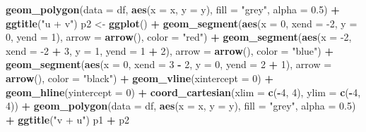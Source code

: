 \documentclass[
]{book}
\newenvironment{Shaded}{\begin{snugshade}}{\end{snugshade}}
\newcommand{\DataTypeTok}[1]{\textcolor[rgb]{0.13,0.29,0.53}{#1}}
\newcommand{\DecValTok}[1]{\textcolor[rgb]{0.00,0.00,0.81}{#1}}
\newcommand{\FloatTok}[1]{\textcolor[rgb]{0.00,0.00,0.81}{#1}}
\newcommand{\KeywordTok}[1]{\textcolor[rgb]{0.13,0.29,0.53}{\textbf{#1}}}
\newcommand{\NormalTok}[1]{#1}
\newcommand{\OperatorTok}[1]{\textcolor[rgb]{0.81,0.36,0.00}{\textbf{#1}}}
\newcommand{\StringTok}[1]{\textcolor[rgb]{0.31,0.60,0.02}{#1}}
\theoremstyle{definition}
\theoremstyle{definition}
\theoremstyle{definition}
\theoremstyle{definition}
\theoremstyle{remark}
\begin{document}
\begin{Shaded}
\begin{Highlighting}[]
\StringTok{    }\KeywordTok{geom_polygon}\NormalTok{(}\DataTypeTok{data =}\NormalTok{ df, }\KeywordTok{aes}\NormalTok{(}\DataTypeTok{x =}\NormalTok{ x, }\DataTypeTok{y =}\NormalTok{ y), }\DataTypeTok{fill =} \StringTok{"grey"}\NormalTok{, }\DataTypeTok{alpha =} \FloatTok{0.5}\NormalTok{) }\OperatorTok{+}
\StringTok{    }\KeywordTok{ggtitle}\NormalTok{(}\StringTok{"u + v"}\NormalTok{)}
\NormalTok{p2 <-}\StringTok{ }\KeywordTok{ggplot}\NormalTok{() }\OperatorTok{+}
\StringTok{    }\KeywordTok{geom_segment}\NormalTok{(}\KeywordTok{aes}\NormalTok{(}\DataTypeTok{x =} \DecValTok{0}\NormalTok{, }\DataTypeTok{xend =} \DecValTok{-2}\NormalTok{, }\DataTypeTok{y =} \DecValTok{0}\NormalTok{, }\DataTypeTok{yend =} \DecValTok{1}\NormalTok{), }\DataTypeTok{arrow =} \KeywordTok{arrow}\NormalTok{(), }\DataTypeTok{color =} \StringTok{"red"}\NormalTok{) }\OperatorTok{+}
\StringTok{    }\KeywordTok{geom_segment}\NormalTok{(}\KeywordTok{aes}\NormalTok{(}\DataTypeTok{x =} \DecValTok{-2}\NormalTok{, }\DataTypeTok{xend =} \DecValTok{-2} \OperatorTok{+}\StringTok{ }\DecValTok{3}\NormalTok{, }\DataTypeTok{y =} \DecValTok{1}\NormalTok{, }\DataTypeTok{yend =} \DecValTok{1} \OperatorTok{+}\StringTok{ }\DecValTok{2}\NormalTok{), }\DataTypeTok{arrow =} \KeywordTok{arrow}\NormalTok{(), }\DataTypeTok{color =} \StringTok{"blue"}\NormalTok{) }\OperatorTok{+}
\StringTok{    }\KeywordTok{geom_segment}\NormalTok{(}\KeywordTok{aes}\NormalTok{(}\DataTypeTok{x =} \DecValTok{0}\NormalTok{, }\DataTypeTok{xend =} \DecValTok{3} \OperatorTok{-}\StringTok{ }\DecValTok{2}\NormalTok{, }\DataTypeTok{y =} \DecValTok{0}\NormalTok{, }\DataTypeTok{yend =} \DecValTok{2} \OperatorTok{+}\StringTok{ }\DecValTok{1}\NormalTok{), }\DataTypeTok{arrow =} \KeywordTok{arrow}\NormalTok{(), }\DataTypeTok{color =} \StringTok{"black"}\NormalTok{) }\OperatorTok{+}
\StringTok{    }\KeywordTok{geom_vline}\NormalTok{(}\DataTypeTok{xintercept =} \DecValTok{0}\NormalTok{) }\OperatorTok{+}\StringTok{ }
\StringTok{    }\KeywordTok{geom_hline}\NormalTok{(}\DataTypeTok{yintercept =} \DecValTok{0}\NormalTok{) }\OperatorTok{+}
\StringTok{    }\KeywordTok{coord_cartesian}\NormalTok{(}\DataTypeTok{xlim =} \KeywordTok{c}\NormalTok{(}\OperatorTok{-}\DecValTok{4}\NormalTok{, }\DecValTok{4}\NormalTok{), }\DataTypeTok{ylim =} \KeywordTok{c}\NormalTok{(}\OperatorTok{-}\DecValTok{4}\NormalTok{, }\DecValTok{4}\NormalTok{)) }\OperatorTok{+}
\StringTok{    }\KeywordTok{geom_polygon}\NormalTok{(}\DataTypeTok{data =}\NormalTok{ df, }\KeywordTok{aes}\NormalTok{(}\DataTypeTok{x =}\NormalTok{ x, }\DataTypeTok{y =}\NormalTok{ y), }\DataTypeTok{fill =} \StringTok{"grey"}\NormalTok{, }\DataTypeTok{alpha =} \FloatTok{0.5}\NormalTok{) }\OperatorTok{+}
\StringTok{    }\KeywordTok{ggtitle}\NormalTok{(}\StringTok{"v + u"}\NormalTok{)}
\NormalTok{p1 }\OperatorTok{+}\StringTok{ }\NormalTok{p2}
\end{Highlighting}
\end{Shaded}
\end{document}
